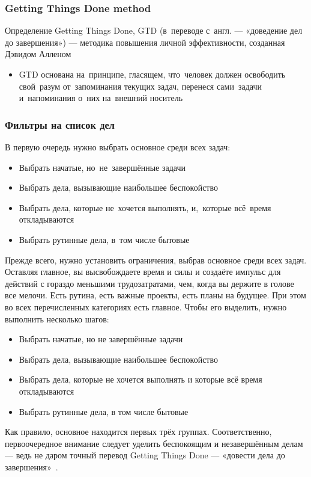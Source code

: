 \documentclass{../industrial-development}
\begin{document}
\begin{frame} \frametitle{Getting Things Done method}
  \begin{block}{Определение}
    Getting Things Done, GTD (в~переводе с~англ. — «доведение дел до завершения») --- методика повышения личной эффективности, созданная Дэвидом Алленом
  \end{block}
  \begin{itemize}
  \item GTD основана на~принципе, гласящем, что~человек должен освободить свой~разум от~запоминания текущих задач, перенеся сами~задачи и~напоминания о~них на~внешний носитель
  \end{itemize}
\end{frame}

\begin{frame} \frametitle{Фильтры на список дел}
В первую очередь нужно выбрать основное среди всех задач:
  \begin{itemize}
  \item Выбрать начатые, но~не~завершённые задачи
  \item Выбрать дела, вызывающие наибольшее беспокойство
  \item Выбрать дела, которые не~хочется выполнять, и,~которые всё~время откладываются
  \item Выбрать рутинные дела, в~том числе бытовые
  \end{itemize}
\end{frame}

\lecturenotes

Прежде всего, нужно установить ограничения, выбрав основное среди всех задач. Оставляя главное, вы высвобождаете время и силы и создаёте импульс для действий с гораздо меньшими трудозатратами, чем, когда вы держите в голове все мелочи. Есть рутина, есть важные проекты, есть планы на будущее. При этом во всех перечисленных категориях есть главное. Чтобы его выделить, нужно выполнить несколько шагов:
  \begin{itemize}
  \item Выбрать начатые, но не завершённые задачи
  \item Выбрать дела, вызывающие наибольшее беспокойство
  \item Выбрать дела, которые не хочется выполнять и которые всё время откладываются
  \item Выбрать рутинные дела, в том числе бытовые
  \end{itemize}
Как правило, основное находится первых трёх группах. Соответственно, первоочередное внимание следует уделить беспокоящим и незавершённым делам — ведь не даром точный перевод Getting Things Done — «довести дела до завершения»~\cite{GTDHabr}.
\end{document}
